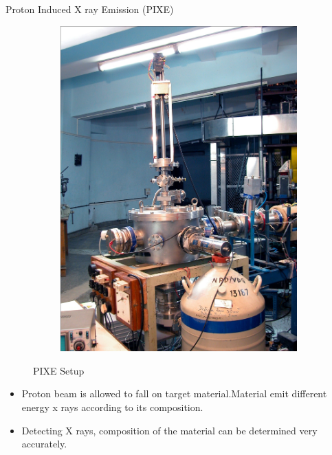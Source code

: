\documentclass[11pt]{beamer}
\begin{document}
\begin{frame}{Proton Induced X ray Emission (PIXE)}

  \begin{figure}
        \centering
        \begin{subfigure}[b]{0.3\textwidth}
                \includegraphics[width=\textwidth]{Pixe_setup.jpg}
        \end{subfigure}%
               
        \caption{PIXE Setup}\label{fig:PIXE Setup}
\end{figure}
  
  
  \begin{itemize}
    
    \item Proton beam is allowed to fall on target material.Material  emit different energy x rays according to its composition. 
	\item Detecting X rays, composition of the material can be determined very accurately.
		           
   \end{itemize}


\end{frame}
\end{document}
